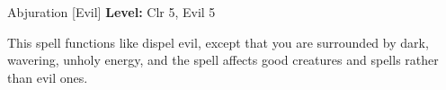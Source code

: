 {Abjuration [Evil]}
{
	\textbf{Level:}
	Clr 5, Evil 5\\
}
{
	This spell functions like dispel evil, except that you are surrounded by dark, wavering, unholy energy, and the spell affects good creatures and spells rather than evil ones.

}
